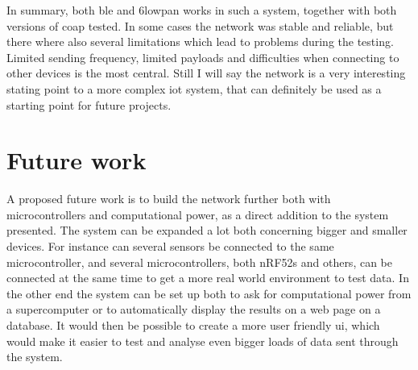 \noindent In summary, both \gls{ble} and \gls{6lowpan} works in such a system, together with both versions of \gls{coap} tested. In some cases the network was stable and reliable, but there where also several limitations which lead to problems during the testing. Limited sending frequency, limited payloads and difficulties when connecting to other devices is the most central. Still I will say the network is a very interesting stating point to a more complex \gls{iot} system, that can definitely be used as a starting point for future projects. 


\section{Future work}


\noindent A proposed future work is to build the network further both with \glspl{microcontroller} and computational power, as a direct addition to the system presented. The system can be expanded a lot both concerning bigger and smaller devices. For instance can several sensors be connected to the same \gls{microcontroller}, and several \glspl{microcontroller}, both \glspl{nRF52} and others, can be connected at the same time to get a more real world environment to test data. In the other end the system can be set up both to ask for computational power from a supercomputer or to automatically display the results on a web page on a database. It would then be possible to create a more user friendly \gls{ui}, which would make it easier to test and analyse even bigger loads of data sent through the system. 





